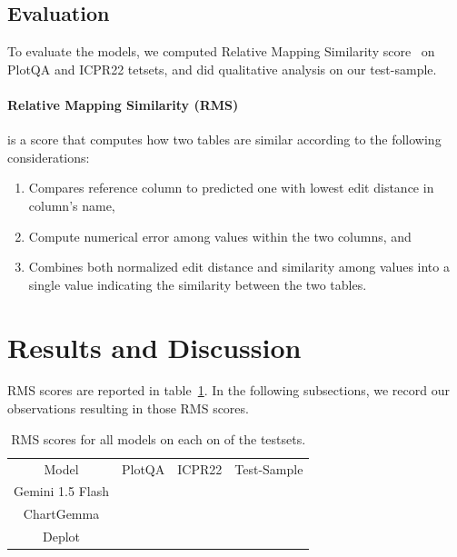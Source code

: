 \documentclass[
	letterpaper, %
]{jdf}
\begin{document}
\subsection{Evaluation}
To evaluate the models, we computed Relative Mapping Similarity score~\cite{liu2022deplot} on PlotQA and ICPR22 tetsets, and did qualitative analysis on our test-sample.

\paragraph{Relative Mapping Similarity (RMS)~\cite{liu2022deplot}} is a score that computes how two tables are similar according to the following considerations:
        \begin{enumerate}
                 \item Compares reference column to predicted one with lowest edit distance in column's name,
                 \item Compute numerical error among values within the two columns, and
                 \item Combines both normalized edit distance and similarity among values into a single value indicating the similarity between the two tables.
                      \end{enumerate}

\section{Results and Discussion}\label{sect:qualitative-analysis}
RMS scores are reported in table~\ref{tab:rms-scores}.
In the following subsections, we record our observations resulting in those RMS scores.
\begin{table}
     \begin{tabular}{ |c|c|c|c| }
         Model & PlotQA & ICPR22 & Test-Sample \\
         Gemini 1.5 Flash & & & \\
         ChartGemma & & & \\
         Deplot & & & \\
     \end{tabular}
     \caption{RMS scores for all models on each on of the testsets.}
     \label{tab:rms-scores}
      \end{table}
\end{document}
